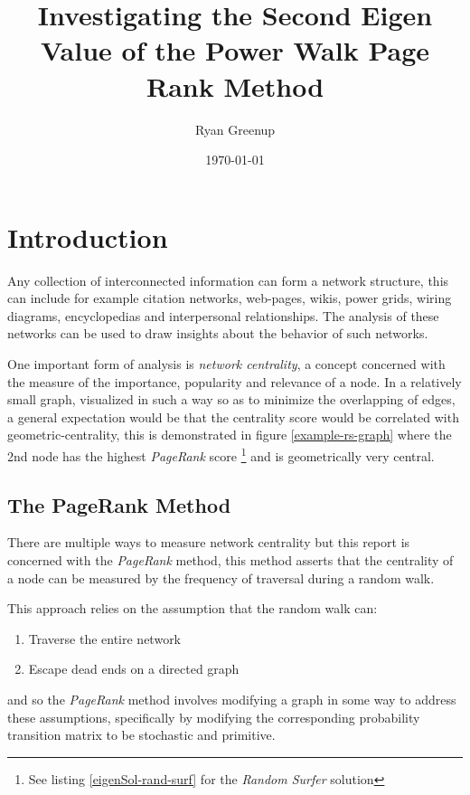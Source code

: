 \documentclass[11pt, twoside]{report}
\author{Ryan Greenup}
\date{\today}
\title{Investigating the Second Eigen Value of the Power Walk Page Rank Method}
\begin{document}
\maketitle
\tableofcontents



\section{Introduction}
\label{sec:org93e4f0c}
Any collection of interconnected information can form a network structure,
this can include for example citation networks, web-pages, wikis, power grids, wiring diagrams, encyclopedias and interpersonal
relationships. The analysis of these networks can be used to draw insights about
the behavior of such networks.

One important form of analysis is \emph{network centrality}, a concept concerned with
the measure of the importance, popularity and relevance of a node. In a
relatively small graph, visualized in such a way so as to minimize the
overlapping of edges, a general expectation would be that the centrality score
would be correlated with geometric-centrality, this is demonstrated in figure
\ref{example-rs-graph} where the 2nd node has the highest \emph{PageRank} score \footnote{See listing \ref{eigenSol-rand-surf} for the \textit{Random Surfer} solution } and
is geometrically very central.

\subsection{The PageRank Method}
\label{sec:org9a3667e}

There are multiple ways to measure network centrality but this report is
concerned with the \emph{PageRank} method, this method asserts that the centrality of
a node can be measured by the frequency of traversal during a random walk.

This approach relies on the assumption that the random walk can:

\begin{enumerate}
\item Traverse the entire network
\item Escape dead ends on a directed graph
\end{enumerate}


and so the \emph{PageRank} method involves modifying a graph in some way to address
these assumptions, specifically by modifying the corresponding probability
transition matrix to be stochastic and primitive.
\end{document}
